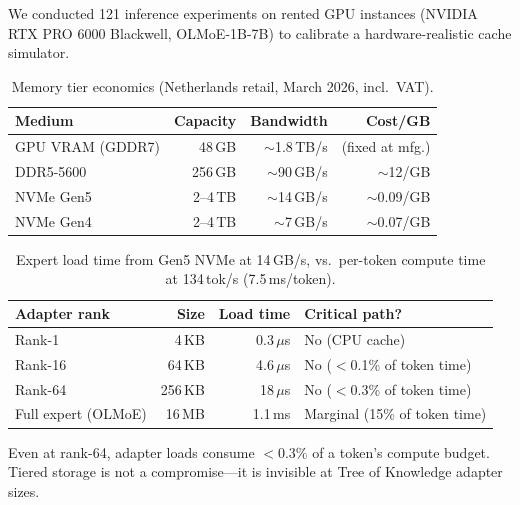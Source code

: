 \documentclass{article}
\newcommand{\tok}{Tree of Knowledge}
\begin{document}
We conducted 121 inference experiments on rented GPU instances (NVIDIA RTX PRO
6000 Blackwell, OLMoE-1B-7B) to calibrate a hardware-realistic cache simulator.

\begin{table}[h]
\centering
\caption{Memory tier economics (Netherlands retail, March 2026, incl.\ VAT).}
\label{tab:tiers}
\begin{tabular}{@{}lrrr@{}}
\toprule
Medium & Capacity & Bandwidth & Cost/GB \\
\midrule
GPU VRAM (GDDR7) & 48\,GB & $\sim$1.8\,TB/s & (fixed at mfg.) \\
DDR5-5600 & 256\,GB & $\sim$90\,GB/s & $\sim$\texteuro{}12/GB \\
NVMe Gen5 & 2--4\,TB & $\sim$14\,GB/s & $\sim$\texteuro{}0.09/GB \\
NVMe Gen4 & 2--4\,TB & $\sim$7\,GB/s & $\sim$\texteuro{}0.07/GB \\
\bottomrule
\end{tabular}
\end{table}

\begin{table}[h]
\centering
\caption{Expert load time from Gen5 NVMe at 14\,GB/s, vs.\ per-token compute
time at 134\,tok/s (7.5\,ms/token).}
\label{tab:load-times}
\begin{tabular}{@{}lrrl@{}}
\toprule
Adapter rank & Size & Load time & Critical path? \\
\midrule
Rank-1 & 4\,KB & 0.3\,$\mu$s & No (CPU cache) \\
Rank-16 & 64\,KB & 4.6\,$\mu$s & No ($<$0.1\% of token time) \\
Rank-64 & 256\,KB & 18\,$\mu$s & No ($<$0.3\% of token time) \\
Full expert (OLMoE) & 16\,MB & 1.1\,ms & Marginal (15\% of token time) \\
\bottomrule
\end{tabular}
\end{table}

Even at rank-64, adapter loads consume $<$0.3\% of a token's compute budget.
Tiered storage is not a compromise---it is invisible at \tok{} adapter sizes.
\end{document}
